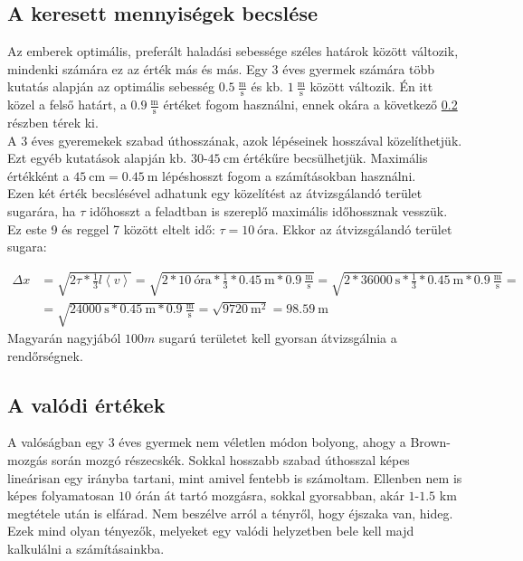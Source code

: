 \subsection{A keresett mennyiségek becslése} \label{sub:3.2}
Az emberek optimális, preferált haladási sebessége széles határok között változik, mindenki számára ez az érték más és más. Egy 3 éves gyermek számára több kutatás alapján az optimális sebesség $0.5\ \frac{\text{m}}{\text{s}}$ és kb. $1\ \frac{\text{m}}{\text{s}}$ között változik\cite{dejaeger2001energy}\cite{larusdottir2011evacuation}\cite{cavagna1983mechanics}. Én itt közel a felső határt, a $0.9\ \frac{\text{m}}{\text{s}}$ értéket fogom használni, ennek okára a következő \ref{sub:3.3} részben térek ki. \\
A 3 éves gyeremekek szabad úthosszának, azok lépéseinek hosszával közelíthetjük. Ezt egyéb kutatások alapján kb. $30$-$45\ \text{cm}$ értékűre becsülhetjük\cite{gill2016relationship}. Maximális értékként a $45\ \text{cm} = 0.45\ \text{m}$ lépéshosszt fogom a számításokban használni.\\
Ezen két érték becslésével adhatunk egy közelítést az átvizsgálandó terület sugarára, ha $\tau$ időhosszt a feladtban is szereplő maximális időhossznak vesszük. Ez este 9 és reggel 7 között eltelt idő: $\tau = 10\ \text{óra}$. Ekkor az átvizsgálandó terület sugara:

\begin{align}
    \Delta x
    &=
    \sqrt{2 \tau * \frac{1}{3} l \left< v \right>}
    =
    \sqrt{2 * 10\ \text{óra} * \frac{1}{3} * 0.45\ \text{m} * 0.9\ \frac{\text{m}}{\text{s}}}
    =
    \sqrt{2 * 36000\ \text{s} * \frac{1}{3} * 0.45\ \text{m} * 0.9\ \frac{\text{m}}{\text{s}}}
    = \nonumber \\
    &=
    \sqrt{24000\ \text{s} * 0.45\ \text{m} * 0.9\ \frac{\text{m}}{\text{s}}}
    =
    \sqrt{9720\ \text{m}^{2}}
    =
    \boxed{98.59\ \text{m}}
\end{align}
Magyarán nagyjából $100m$ sugarú területet kell gyorsan átvizsgálnia a rendőrségnek.

\subsection{A valódi értékek} \label{sub:3.3}
A valóságban egy 3 éves gyermek nem véletlen módon bolyong, ahogy a Brown-mozgás során mozgó részecskék. Sokkal hosszabb szabad úthosszal képes lineárisan egy irányba tartani, mint amivel fentebb is számoltam. Ellenben nem is képes folyamatosan $10$ órán át tartó mozgásra, sokkal gyorsabban, akár $1$-$1.5$ km megtétele után is elfárad. Nem beszélve arról a tényről, hogy éjszaka van, hideg. Ezek mind olyan tényezők, melyeket egy valódi helyzetben bele kell majd kalkulálni a számításainkba.